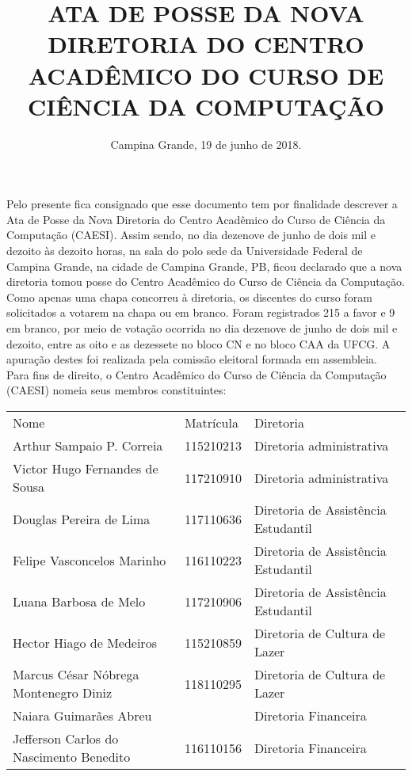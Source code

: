 \documentclass[11pt,letterpaper]{article}
\begin{document}
\title{ ATA DE POSSE DA NOVA DIRETORIA DO CENTRO ACADÊMICO DO CURSO DE CIÊNCIA DA COMPUTAÇÃO }
\date{Campina Grande, 19 de junho de 2018.}
\maketitle

Pelo presente fica consignado que esse documento tem por finalidade descrever a Ata de Posse da Nova Diretoria do Centro Acadêmico do Curso de Ciência da Computação (CAESI). Assim sendo, no dia dezenove de junho de dois mil e dezoito às dezoito horas, na sala do polo sede da Universidade Federal de Campina Grande, na cidade de Campina Grande, PB, ficou declarado que a nova diretoria tomou posse do Centro Acadêmico do Curso de Ciência da Computação. \\

Como apenas uma chapa concorreu à diretoria, os discentes do curso foram solicitados a votarem na chapa ou em branco. Foram registrados 215 a favor e 9 em branco, por meio de votação ocorrida no dia dezenove de junho de dois mil e dezoito, entre as oito e as dezessete no bloco CN e no bloco CAA da UFCG. A apuração destes foi realizada pela comissão eleitoral formada em assembleia. \\

Para fins de direito, o Centro Acadêmico do Curso de Ciência da Computação (CAESI) nomeia seus membros constituintes:\\

\begin{center}
\begin{tabular}{|l|l|l|}
\hline
Nome & Matrícula & Diretoria \\
Arthur Sampaio P. Correia & 115210213 & Diretoria administrativa \\
Victor Hugo Fernandes de Sousa & 117210910 & Diretoria administrativa \\
Douglas Pereira de Lima & 117110636 & Diretoria de Assistência Estudantil \\
Felipe Vasconcelos Marinho & 116110223 & Diretoria de Assistência Estudantil \\
Luana Barbosa de Melo & 117210906 & Diretoria de Assistência Estudantil \\
Hector Hiago de Medeiros & 115210859 & Diretoria de Cultura de Lazer \\
Marcus César Nóbrega Montenegro Diniz & 118110295 & Diretoria de Cultura de Lazer \\
Naiara Guimarães Abreu & &  Diretoria Financeira \\
Jefferson Carlos do Nascimento Benedito & 116110156 & Diretoria Financeira \\
\hline
\end{tabular}\\
\end{center}
\end{document}
